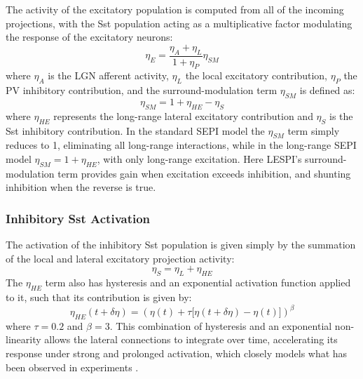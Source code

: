 The activity of the excitatory population is computed from all of the
incoming projections, with the Sst population acting as a
multiplicative factor modulating the response of the excitatory
neurons:
\begin{equation}
  \eta_{E} = \frac{\eta_{A} + \eta_{L}}{1 + \eta_{P}} \eta_{SM}
\end{equation}
where $\eta_{A}$ is the LGN afferent activity, $\eta_{L}$ the local
excitatory contribution, $\eta_{P}$ the PV inhibitory contribution,
and the surround-modulation term $\eta_{SM}$ is defined as:
\begin{equation}
  \eta_{SM} = 1 + \eta_{HE} - \eta_{S}
\end{equation}
where $\eta_{HE}$ represents the long-range lateral excitatory
contribution and $\eta_{S}$ is the Sst inhibitory contribution.
In the standard SEPI model the $\eta_{SM}$ term simply reduces to 1,
eliminating all long-range interactions, while in the long-range SEPI
model $\eta_{SM} = 1 + \eta_{HE}$, with only long-range excitation.
Here LESPI's surround-modulation term provides gain when excitation
exceeds inhibition, and shunting inhibition when the reverse is true.

\subsubsection{Inhibitory Sst Activation}

The activation of the inhibitory Sst population is given simply by the
summation of the local and lateral excitatory projection activity:
\begin{equation}
  \eta_{S} = \eta_{L} + \eta_{HE}
\end{equation}
The $\eta_{HE}$ term also has hysteresis and an
exponential activation function applied to it, such that its
contribution is given by:
\begin{equation}
  \eta_{HE} (t + \delta\eta) = (\eta(t) + \tau \big[ \eta(t+\delta\eta) - \eta(t) \big])^\beta
\end{equation}
where $\tau=0.2$ and $\beta=3$. This combination of hysteresis and an
exponential non-linearity allows the lateral connections to integrate
over time, accelerating its response under strong and prolonged
activation, which closely models what has been observed in experiments
\citep{Beierlein2003,Bartley2008,Tan2008}.


